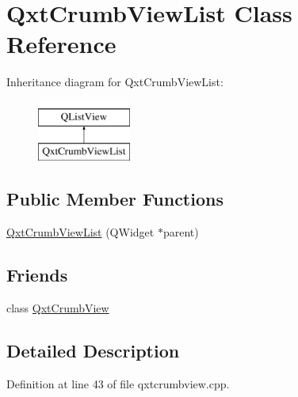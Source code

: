 \hypertarget{class_qxt_crumb_view_list}{\section{Qxt\-Crumb\-View\-List Class Reference}
\label{class_qxt_crumb_view_list}
}
Inheritance diagram for Qxt\-Crumb\-View\-List\-:\begin{figure}[H]
\begin{center}
\leavevmode
\includegraphics[height=2.000000cm]{class_qxt_crumb_view_list}
\end{center}
\end{figure}
\subsection*{Public Member Functions}
\begin{DoxyCompactItemize}
\item 
\hyperlink{class_qxt_crumb_view_list_a5d465b65f1879530fc596b58a313e745}{Qxt\-Crumb\-View\-List} (Q\-Widget $\ast$parent)
\end{DoxyCompactItemize}
\subsection*{Friends}
\begin{DoxyCompactItemize}
\item 
class \hyperlink{class_qxt_crumb_view_list_a919f7d50c12742a5249bcb66da2fd3f2}{Qxt\-Crumb\-View}
\end{DoxyCompactItemize}


\subsection{Detailed Description}


Definition at line 43 of file qxtcrumbview.\-cpp.



